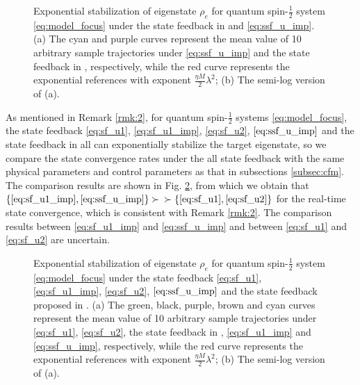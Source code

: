 \documentclass[]{elsarticle}
\begin{document}
\begin{figure}[!htbp]
	\centering
	\hfil
	\caption{Exponential stabilization of eigenstate $\rho_{e}$ for quantum spin-$\frac{1}{2}$ system \eqref{eq:model_focus} under the state feedback in \cite{WSJZJ2021b} and \eqref{eq:ssf_u_imp}. (a) The cyan and purple curves represent the mean value of 10 arbitrary sample trajectories under \eqref{eq:ssf_u_imp} and the state feedback in \cite{WSJZJ2021b}, respectively, while the red curve represents the exponential references with exponent $\frac{{\eta M}}{2}\lambda^{2}$; (b)  The semi-log version of (a).}
	\label{figur:numerical_results_4}
\end{figure}

As mentioned in Remark \ref{rmk:2}, for quantum spin-$\frac{1}{2}$ systems \eqref{eq:model_focus}, the state feedback \eqref{eq:sf_u1}, \eqref{eq:sf_u1_imp}, \eqref{eq:sf_u2}, $\eqref{eq:ssf_u_imp}$ and the state feedback in \cite{WSJZJ2021b} all can exponentially stabilize the target eigenstate, so we compare the state convergence rates under the all state feedback with the same physical parameters and control parameters as that in subsections \ref{subsec:cfm}. The comparison results are shown in Fig. \ref{figur:numerical_results_5}, from which we obtain that $\{\eqref{eq:sf_u1_imp}, \eqref{eq:ssf_u_imp}\} \succ$  \cite{WSJZJ2021b} $\succ \{ \eqref{eq:sf_u1}, \eqref{eq:sf_u2}\}$ for the real-time state convergence, which is consistent with Remark \ref{rmk:2}. The comparison results between \eqref{eq:sf_u1_imp} and \eqref{eq:ssf_u_imp} and between \eqref{eq:sf_u1} and \eqref{eq:sf_u2} are uncertain.
\begin{figure}[!htbp]
	\centering
	\hfil
	\caption{Exponential stabilization of eigenstate $\rho_{e}$ for quantum spin-$\frac{1}{2}$ system \eqref{eq:model_focus} under the state feedback \eqref{eq:sf_u1}, \eqref{eq:sf_u1_imp}, \eqref{eq:sf_u2}, $\eqref{eq:ssf_u_imp}$ and the state feedback proposed in \cite{WSJZJ2021b}. (a) The green, black, purple, brown and cyan curves represent the mean value of 10 arbitrary sample trajectories under \eqref{eq:sf_u1}, \eqref{eq:sf_u2}, the state feedback in \cite{WSJZJ2021b}, \eqref{eq:sf_u1_imp} and \eqref{eq:ssf_u_imp}, respectively, while the red curve represents the exponential references with exponent $\frac{{\eta M}}{2}\lambda^{2}$; (b)  The semi-log version of (a).}
	\label{figur:numerical_results_5}
\end{figure}
\end{document}
